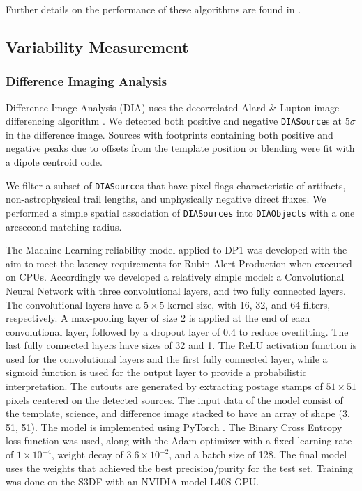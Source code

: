 Further details on the performance of these algorithms are found in .

\subsection{Variability Measurement}
\subsubsection{Difference Imaging Analysis}
\label{ssec:diffim_analysis}
Difference Image Analysis (DIA) uses the decorrelated Alard \& Lupton image differencing algorithm \citep{DMTN-021}.
We detected both positive and negative \texttt{DIASource}s at $5\sigma$ in the difference image.
Sources with footprints containing both positive and negative peaks due to offsets from the template position or blending were fit with a dipole centroid code.

We filter a subset of \texttt{DIASource}s that have pixel flags characteristic of artifacts, non-astrophysical trail lengths, and unphysically negative direct fluxes.
We performed a simple spatial association of \texttt{DIASources} into \texttt{DIAObjects} with a one arcsecond matching radius.

The Machine Learning reliability model applied to DP1 was developed with the aim to meet the latency requirements for Rubin \gls{Alert Production} when executed on CPUs. Accordingly we developed a relatively simple model: a Convolutional Neural Network with three convolutional layers, and two fully connected layers.
The convolutional layers have a $5\times5$ kernel size, with 16, 32, and 64 filters, respectively.
A max-pooling layer of size 2 is applied at the end of each convolutional layer, followed by a dropout layer of 0.4 to reduce overfitting.
The last fully connected layers have sizes of 32 and 1.
The ReLU activation function is used for the convolutional layers and the first fully connected layer, while a sigmoid function is used for the output layer to provide a probabilistic interpretation.
The cutouts are generated by extracting postage stamps of $51\times51$ pixels centered on the detected sources.
The input data of the model consist of the template, science, and difference image stacked to have an array of \gls{shape} (3, 51, 51).
The model is implemented using PyTorch \citep{10.1145/3620665.3640366}.
The Binary Cross Entropy loss function was used, along with the \gls{Adam} optimizer with a fixed learning rate of $1\times10^{-4}$, weight decay of $3.6\times10^{-2}$, and a batch size of 128.
The final model uses the weights that achieved the best precision/purity for the test set.
Training was done on the \gls{S3DF} with an NVIDIA model L40S GPU.


